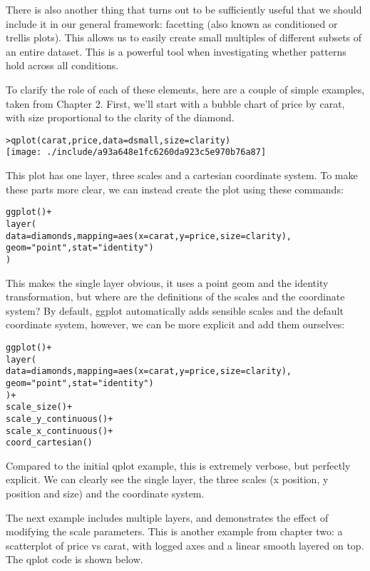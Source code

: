 There is also another thing that turns out to be sufficiently useful that we should include it in our general framework: facetting (also known as conditioned or trellis plots). This allows us to easily create small multiples of different subsets of an entire dataset. This is a powerful tool when investigating whether patterns hold across all conditions.

To clarify the role of each of these elements, here are a couple of simple examples, taken from Chapter 2.  First, we'll start with a bubble chart of price by carat, with size proportional to the clarity of the diamond.

\begin{alltt}
> qplot(carat, price, data = dsmall, size = clarity)
\texttt{[image: ./include/a93a648e1fc6260da923c5e970b76a87]}

\end{alltt}

This plot has one layer, three scales and a cartesian coordinate system.  To make these parts more clear, we can instead create the plot using these commands:

\begin{alltt}
ggplot() + 
layer(
    data = diamonds, mapping = aes(x = carat, y = price, size = clarity),
    geom = "point", stat = "identity")
  )
\end{alltt}

This makes the single layer obvious, it uses a point geom and the identity transformation, but where are the definitions of the scales and the coordinate system?  By default, ggplot automatically adds sensible scales and the default coordinate system, however, we can be more explicit and add them ourselves:

\begin{alltt}
ggplot() + 
layer(
    data = diamonds, mapping = aes(x = carat, y = price, size = clarity),
    geom = "point", stat = "identity")
) + 
scale_size() + 
scale_y_continuous() + 
scale_x_continuous() + 
coord_cartesian()
\end{alltt}

Compared to the initial qplot example, this is extremely verbose, but perfectly explicit.  We  can clearly see the single layer, the three scales (x position, y position and size) and the coordinate system.  

The next example includes multiple layers, and demonstrates the effect of modifying the scale parameters.  This is another example from chapter two: a scatterplot of price vs carat, with logged axes and a linear smooth layered on top.  The qplot code is shown below.

